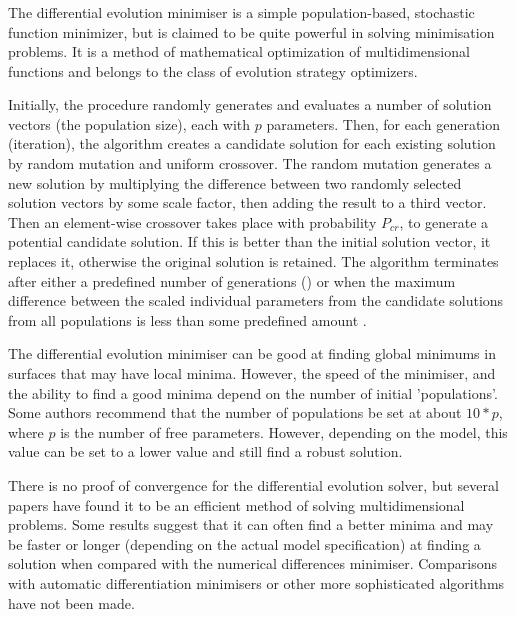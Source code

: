 \subsubsection{}\label{sec:Minimiser-DESolver}

The differential evolution minimiser is a simple population-based, stochastic function minimizer, but is claimed to be quite powerful in solving minimisation problems. It is a method of mathematical optimization of multidimensional functions and belongs to the class of evolution strategy optimizers.

Initially, the procedure randomly generates and evaluates a number of solution vectors (the population size), each with $p$ parameters. Then, for each generation (iteration), the algorithm creates a candidate solution for each existing solution by random mutation and uniform crossover. The random mutation generates a new solution by multiplying the difference between two randomly selected solution vectors by some scale factor, then adding the result to a third vector. Then an element-wise crossover takes place with probability $P_{cr}$, to generate a potential candidate solution. If this is better than the initial solution vector, it replaces it, otherwise the original solution is retained. The algorithm terminates after either a predefined number of generations () or when the maximum difference between the scaled individual parameters from the candidate solutions from all populations is less than some predefined amount .

The differential evolution minimiser can be good at finding global minimums in surfaces that may have local minima. However, the speed of the minimiser, and the ability to find a good minima depend on the number of initial 'populations'. Some authors recommend that the number of populations be set at about $10*p$, where $p$ is the number of free parameters. However, depending on the model, this value can be set to a lower value and still find a robust solution.

There is no proof of convergence for the differential evolution solver, but several papers have found it to be an efficient method of solving multidimensional problems. Some results suggest that it can often find a better minima and may be faster or longer (depending on the actual model specification) at finding a solution when compared with the numerical differences minimiser. Comparisons with automatic differentiation minimisers or other more sophisticated algorithms have not been made.


